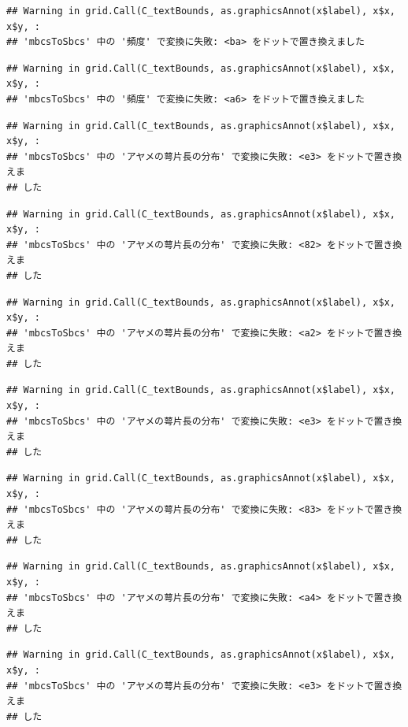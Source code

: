 \documentclass[
]{book}
\begin{document}
\begin{verbatim}
## Warning in grid.Call(C_textBounds, as.graphicsAnnot(x$label), x$x, x$y, :
## 'mbcsToSbcs' 中の '頻度' で変換に失敗: <ba> をドットで置き換えました
\end{verbatim}

\begin{verbatim}
## Warning in grid.Call(C_textBounds, as.graphicsAnnot(x$label), x$x, x$y, :
## 'mbcsToSbcs' 中の '頻度' で変換に失敗: <a6> をドットで置き換えました
\end{verbatim}

\begin{verbatim}
## Warning in grid.Call(C_textBounds, as.graphicsAnnot(x$label), x$x, x$y, :
## 'mbcsToSbcs' 中の 'アヤメの萼片長の分布' で変換に失敗: <e3> をドットで置き換えま
## した
\end{verbatim}

\begin{verbatim}
## Warning in grid.Call(C_textBounds, as.graphicsAnnot(x$label), x$x, x$y, :
## 'mbcsToSbcs' 中の 'アヤメの萼片長の分布' で変換に失敗: <82> をドットで置き換えま
## した
\end{verbatim}

\begin{verbatim}
## Warning in grid.Call(C_textBounds, as.graphicsAnnot(x$label), x$x, x$y, :
## 'mbcsToSbcs' 中の 'アヤメの萼片長の分布' で変換に失敗: <a2> をドットで置き換えま
## した
\end{verbatim}

\begin{verbatim}
## Warning in grid.Call(C_textBounds, as.graphicsAnnot(x$label), x$x, x$y, :
## 'mbcsToSbcs' 中の 'アヤメの萼片長の分布' で変換に失敗: <e3> をドットで置き換えま
## した
\end{verbatim}

\begin{verbatim}
## Warning in grid.Call(C_textBounds, as.graphicsAnnot(x$label), x$x, x$y, :
## 'mbcsToSbcs' 中の 'アヤメの萼片長の分布' で変換に失敗: <83> をドットで置き換えま
## した
\end{verbatim}

\begin{verbatim}
## Warning in grid.Call(C_textBounds, as.graphicsAnnot(x$label), x$x, x$y, :
## 'mbcsToSbcs' 中の 'アヤメの萼片長の分布' で変換に失敗: <a4> をドットで置き換えま
## した
\end{verbatim}

\begin{verbatim}
## Warning in grid.Call(C_textBounds, as.graphicsAnnot(x$label), x$x, x$y, :
## 'mbcsToSbcs' 中の 'アヤメの萼片長の分布' で変換に失敗: <e3> をドットで置き換えま
## した
\end{verbatim}
\end{document}
